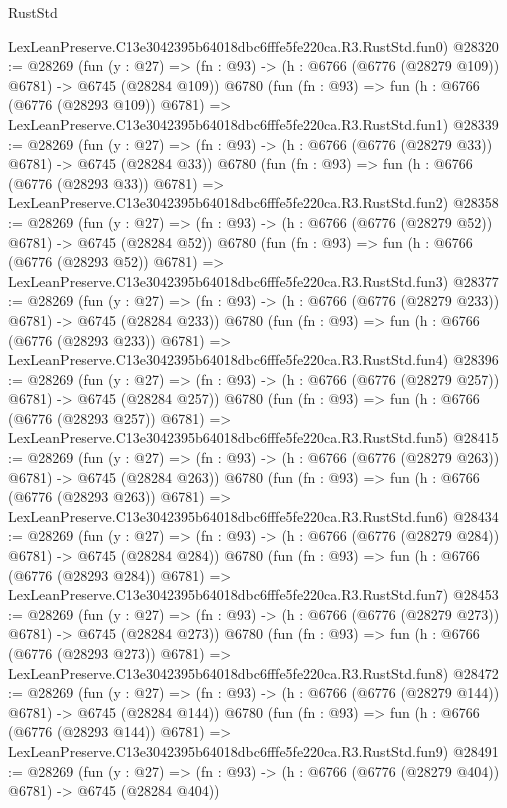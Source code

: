 \begin{lexlean}{RustStd}
\begin{coremodule}
    LexLeanPreserve.C13e3042395b64018dbc6fffe5fe220ca.R3.RustStd.fun0)
@28320 := @28269
    (fun (y : @27) => (fn : @93) -> (h : @6766 (@6776 (@28279 @109)) @6781) -> @6745 (@28284 @109))
    @6780
    (fun (fn : @93) =>
    fun (h : @6766 (@6776 (@28293 @109)) @6781) =>
    LexLeanPreserve.C13e3042395b64018dbc6fffe5fe220ca.R3.RustStd.fun1)
@28339 := @28269
    (fun (y : @27) => (fn : @93) -> (h : @6766 (@6776 (@28279 @33)) @6781) -> @6745 (@28284 @33))
    @6780
    (fun (fn : @93) =>
    fun (h : @6766 (@6776 (@28293 @33)) @6781) =>
    LexLeanPreserve.C13e3042395b64018dbc6fffe5fe220ca.R3.RustStd.fun2)
@28358 := @28269
    (fun (y : @27) => (fn : @93) -> (h : @6766 (@6776 (@28279 @52)) @6781) -> @6745 (@28284 @52))
    @6780
    (fun (fn : @93) =>
    fun (h : @6766 (@6776 (@28293 @52)) @6781) =>
    LexLeanPreserve.C13e3042395b64018dbc6fffe5fe220ca.R3.RustStd.fun3)
@28377 := @28269
    (fun (y : @27) => (fn : @93) -> (h : @6766 (@6776 (@28279 @233)) @6781) -> @6745 (@28284 @233))
    @6780
    (fun (fn : @93) =>
    fun (h : @6766 (@6776 (@28293 @233)) @6781) =>
    LexLeanPreserve.C13e3042395b64018dbc6fffe5fe220ca.R3.RustStd.fun4)
@28396 := @28269
    (fun (y : @27) => (fn : @93) -> (h : @6766 (@6776 (@28279 @257)) @6781) -> @6745 (@28284 @257))
    @6780
    (fun (fn : @93) =>
    fun (h : @6766 (@6776 (@28293 @257)) @6781) =>
    LexLeanPreserve.C13e3042395b64018dbc6fffe5fe220ca.R3.RustStd.fun5)
@28415 := @28269
    (fun (y : @27) => (fn : @93) -> (h : @6766 (@6776 (@28279 @263)) @6781) -> @6745 (@28284 @263))
    @6780
    (fun (fn : @93) =>
    fun (h : @6766 (@6776 (@28293 @263)) @6781) =>
    LexLeanPreserve.C13e3042395b64018dbc6fffe5fe220ca.R3.RustStd.fun6)
@28434 := @28269
    (fun (y : @27) => (fn : @93) -> (h : @6766 (@6776 (@28279 @284)) @6781) -> @6745 (@28284 @284))
    @6780
    (fun (fn : @93) =>
    fun (h : @6766 (@6776 (@28293 @284)) @6781) =>
    LexLeanPreserve.C13e3042395b64018dbc6fffe5fe220ca.R3.RustStd.fun7)
@28453 := @28269
    (fun (y : @27) => (fn : @93) -> (h : @6766 (@6776 (@28279 @273)) @6781) -> @6745 (@28284 @273))
    @6780
    (fun (fn : @93) =>
    fun (h : @6766 (@6776 (@28293 @273)) @6781) =>
    LexLeanPreserve.C13e3042395b64018dbc6fffe5fe220ca.R3.RustStd.fun8)
@28472 := @28269
    (fun (y : @27) => (fn : @93) -> (h : @6766 (@6776 (@28279 @144)) @6781) -> @6745 (@28284 @144))
    @6780
    (fun (fn : @93) =>
    fun (h : @6766 (@6776 (@28293 @144)) @6781) =>
    LexLeanPreserve.C13e3042395b64018dbc6fffe5fe220ca.R3.RustStd.fun9)
@28491 := @28269
    (fun (y : @27) => (fn : @93) -> (h : @6766 (@6776 (@28279 @404)) @6781) -> @6745 (@28284 @404))

\end{coremodule}
\end{lexlean}
